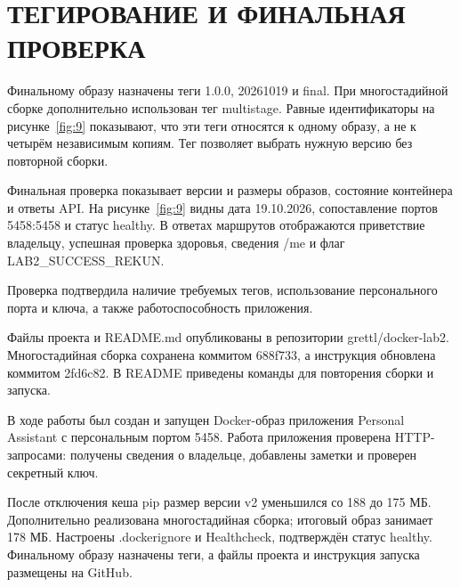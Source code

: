 \documentclass[14pt,a4paper]{extarticle}
\begin{document}
\clearpage
\section{ТЕГИРОВАНИЕ И ФИНАЛЬНАЯ ПРОВЕРКА}

Финальному образу назначены теги 1.0.0, 20261019 и final. При многостадийной сборке дополнительно использован тег multistage. Равные идентификаторы на рисунке~\ref{fig:9} показывают, что эти теги относятся к одному образу, а не к четырём независимым копиям. Тег позволяет выбрать нужную версию без повторной сборки.

Финальная проверка показывает версии и размеры образов, состояние контейнера и ответы API. На рисунке~\ref{fig:9} видны дата 19.10.2026, сопоставление портов 5458:5458 и статус healthy. В ответах маршрутов отображаются приветствие владельцу, успешная проверка здоровья, сведения /me и флаг \mbox{LAB2\_SUCCESS\_REKUN}.

Проверка подтвердила наличие требуемых тегов, использование персонального порта и ключа, а также работоспособность приложения.

Файлы проекта и README.md опубликованы в репозитории grettl/docker-lab2. Многостадийная сборка сохранена коммитом 688f733, а инструкция обновлена коммитом 2fd6c82. В README приведены команды для повторения сборки и запуска.

\clearpage
{}
В ходе работы был создан и запущен Docker-образ приложения Personal Assistant с персональным портом 5458. Работа приложения проверена HTTP-запросами: получены сведения о владельце, добавлены заметки и проверен секретный ключ.

После отключения кеша pip размер версии v2 уменьшился со 188 до 175 МБ. Дополнительно реализована многостадийная сборка; итоговый образ занимает 178 МБ. Настроены .dockerignore и Healthcheck, подтверждён статус healthy. Финальному образу назначены теги, а файлы проекта и инструкция запуска размещены на GitHub.
\end{document}
